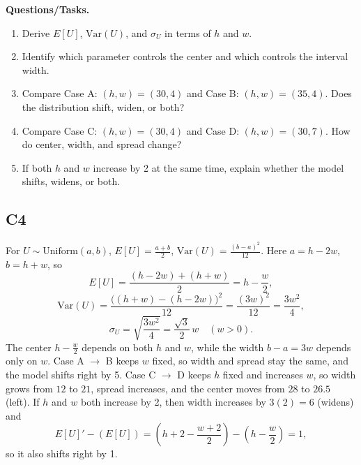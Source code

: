 \textbf{Questions/Tasks.}
\begin{enumerate}[label=\textbf{\alph*)}]
  \item Derive \(E[U]\), \(\mathrm{Var}(U)\), and \(\sigma_U\) in terms of \(h\) and \(w\).
  \item Identify which parameter controls the center and which controls the interval width.
  \item Compare Case A: \((h,w)=(30,4)\) and Case B: \((h,w)=(35,4)\). Does the distribution shift, widen, or both?
  \item Compare Case C: \((h,w)=(30,4)\) and Case D: \((h,w)=(30,7)\). How do center, width, and spread change?
  \item If both \(h\) and \(w\) increase by 2 at the same time, explain whether the model shifts, widens, or both.
\end{enumerate}

\subsection*{C4}
For \(U\sim\text{Uniform}(a,b)\), \(E[U]=\frac{a+b}{2}\), \(\mathrm{Var}(U)=\frac{(b-a)^2}{12}\).
Here \(a=h-2w\), \(b=h+w\), so
\[
E[U]=\frac{(h-2w)+(h+w)}{2}=h-\frac{w}{2},
\]
\[
\mathrm{Var}(U)=\frac{\big((h+w)-(h-2w)\big)^2}{12}=\frac{(3w)^2}{12}=\frac{3w^2}{4},
\]
\[
\sigma_U=\sqrt{\frac{3w^2}{4}}=\frac{\sqrt{3}}{2}\,w \quad (w>0).
\]
The center \(h-\frac{w}{2}\) depends on both \(h\) and \(w\), while the width \(b-a=3w\) depends only on \(w\).
Case A \(\to\) B keeps \(w\) fixed, so width and spread stay the same, and the model shifts right by 5.
Case C \(\to\) D keeps \(h\) fixed and increases \(w\), so width grows from \(12\) to \(21\), spread increases, and the center moves from \(28\) to \(26.5\) (left).
If \(h\) and \(w\) both increase by 2, then width increases by \(3(2)=6\) (widens) and
\[
E[U]'-(E[U])=\left(h+2-\frac{w+2}{2}\right)-\left(h-\frac{w}{2}\right)=1,
\]
so it also shifts right by 1.
\begin{center}
\end{center}


